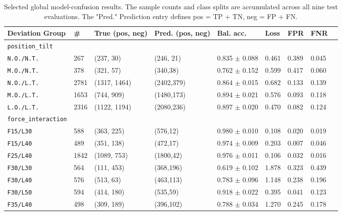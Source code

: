 \begin{table}[htbp]
    \centering
    \caption{Selected global model-confusion results. The sample counts and class splits are accumulated across all nine test evaluations. The "Pred." Prediction entry defines pos = TP + TN, neg = FP + FN.}
    \label{tab:da2_global_selected_groups}
    \scriptsize
    \begin{adjustbox}{width=\textwidth}
    \begin{tabular}{lllllllll}
        \toprule
        \textbf{Deviation Group} &
        \textbf{\#} &
        \textbf{True (pos, neg)} &
        \textbf{Pred. (pos, neg)} &
        \textbf{Bal. acc.} &
        \textbf{Loss} &
        \textbf{FPR} &
        \textbf{FNR} \\
        \midrule
        \texttt{position\_tilt}\\
        \texttt{N.O./N.T.} & 267 & (237, 30) & (246, 21) & 0.835 $\pm$ 0.088 & 0.461 & 0.389 & 0.045 \\
        \texttt{M.O./N.T.} & 378 & (321, 57) & (340,38) & 0.762 $\pm$ 0.152 & 0.599 & 0.417 & 0.060 \\
        \texttt{N.O./L.T.} & 2781 & (1317, 1464) & (2402,379) & 0.864 $\pm$ 0.015 & 0.682 & 0.133 & 0.139 \\
        \texttt{M.O./L.T.} & 1653 & (744, 909) & (1480,173) & 0.894 $\pm$ 0.021 & 0.576 & 0.093 & 0.118 \\
        \texttt{L.O./L.T.} & 2316 & (1122, 1194) & (2080,236) & 0.897 $\pm$ 0.020 & 0.470 & 0.082 & 0.124 \\
        \midrule
        \texttt{force\_interaction} \\
        \texttt{F15/L30} & 588 & (363, 225) & (576,12) & 0.980 $\pm$ 0.010 & 0.108 & 0.020 & 0.019 \\
        \texttt{F15/L40} & 489 & (351, 138) & (472,17) & 0.974 $\pm$ 0.009 & 0.203 & 0.007 & 0.046 \\
        \texttt{F25/L40} & 1842 & (1089, 753) & (1800,42) & 0.976 $\pm$ 0.011 & 0.106 & 0.032 & 0.016 \\
        \texttt{F30/L30} & 564 & (111, 453) & (368,196) & 0.619 $\pm$ 0.102 & 1.878 & 0.323 & 0.439 \\
        \texttt{F30/L40} & 576 & (513, 63) & (463,113) & 0.783 $\pm$ 0.096 & 1.148 & 0.238 & 0.196 \\
        \texttt{F30/L50} & 594 & (414, 180) & (535,59) & 0.918 $\pm$ 0.022 & 0.395 & 0.041 & 0.123 \\
        \texttt{F35/L40} & 498 & (309, 189) & (396,102) & 0.788 $\pm$ 0.034 & 1.270 & 0.245 & 0.178 \\

\end{tabular}
\end{adjustbox}
\end{table}
